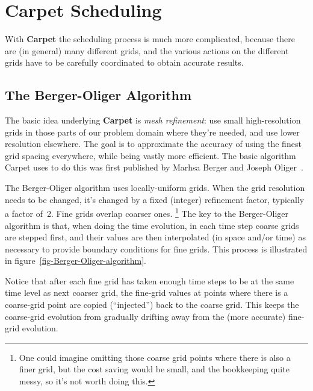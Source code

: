 \documentclass{article}
\def\thorn#1{\textbf{#1}}
\begin{document}

\section{\thorn{Carpet} Scheduling}

With \thorn{Carpet} the scheduling process is much more complicated,
because there are (in general) many different grids, and the various
actions on the different grids have to be carefully coordinated to
obtain accurate results.


\subsection{The Berger-Oliger Algorithm}
\label{sect-Berger-Oliger-algorithm}

The basic idea underlying \thorn{Carpet} is \emph{mesh refinement}:
use small high-resolution grids in those parts of our problem domain
where they're needed, and use lower resolution elsewhere.  The goal
is to approximate the accuracy of using the finest grid spacing
everywhere, while being vastly more efficient.  The basic algorithm
Carpet uses to do this was first published by Marhsa Berger and
Joseph Oliger~\cite{Berger-1982,Berger84,Berger86,Berger89,Berger91}.

The Berger-Oliger algorithm uses locally-uniform grids.  When the grid
resolution needs to be changed, it's changed by a fixed (integer)
refinement factor, typically a factor of~2.  Fine grids overlap
coarser ones.%
\footnote{%
	 One could imagine omitting those coarse grid
	 points where there is also a finer grid, but the
	 cost saving would be small, and the bookkeeping
	 quite messy, so it's not worth doing this.
	 }%
{}  The key to the Berger-Oliger algorithm is that, when doing the time
evolution, in each time step coarse grids are stepped first, and their
values are then interpolated (in space and/or time) as necessary to
provide boundary conditions for fine grids.  This process is illustrated
in figure~\ref{fig-Berger-Oliger-algorithm}.

Notice that after each fine grid has taken enough time steps to be
at the same time level as next coarser grid, the fine-grid values at
points where there is a coarse-grid point are copied (``injected'')
back to the coarse grid.  This keeps the coarse-grid evolution from
gradually drifting away from the (more accurate) fine-grid evolution.
\end{document}
